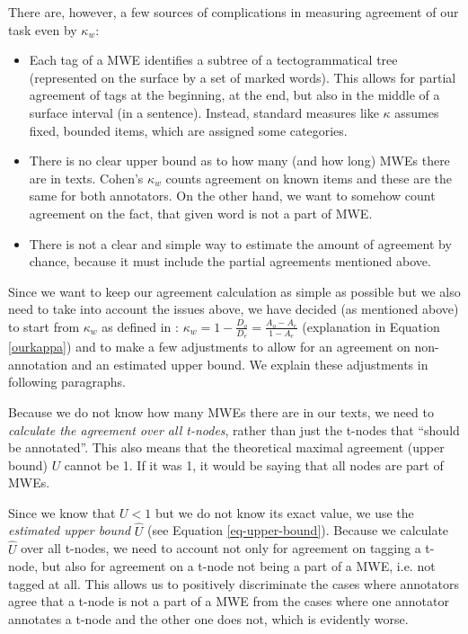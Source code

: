 There are, however, a few sources of complications in measuring agreement of our task even by $\kappa_w$:
\begin{itemize}
	\item %
	Each tag of a MWE identifies a subtree of a tectogrammatical tree (represented on the surface by a set of marked words). This allows for partial agreement of tags at the beginning, at the end, but also in the middle of a surface interval (in a sentence). Instead, standard measures like $\kappa$ assumes fixed, bounded items, which are assigned some categories.
	\item %
	There is no clear upper bound as to how many (and how long) MWEs there are in texts. Cohen's $\kappa_w$ counts agreement on known items and these are the same for both annotators. On the other hand, we want to somehow count agreement on the fact, that given word is not a part of MWE.
	\item 
	There is not a clear and simple way to estimate the amount of agreement by chance, because it must include the partial agreements mentioned above.
\end{itemize}

Since we want to keep our agreement calculation as simple as possible but we also need to take into account the issues above, we have decided (as mentioned above) to start from $\kappa_w$ as defined in \cite{artstein:2007}: $\kappa_w = 1 - \frac{D_o}{D_e} = \frac{A_o - A_e}{1 - A_e}$ (explanation in Equation \ref{ourkappa}) and to make a few adjustments to allow for an agreement on non-annotation and an estimated upper bound. We explain these adjustments in following paragraphs.


Because we do not know how many MWEs there are in our texts, we need to \textit{calculate the agreement over all t-nodes}, rather than just the \mbox{t-nodes} that ``should be annotated''. This also means that the theoretical maximal agreement (upper bound) $U$ cannot be 1. If it was 1, it would be saying that all nodes are part of MWEs. 

Since we know that $U < 1$ but we do not know its exact value, we use the \textit{estimated upper bound} $\widehat{U}$ (see Equation \ref{eq-upper-bound}). Because we calculate $\widehat{U}$ over all t-nodes, we need to account not only for agreement on tagging a t-node, but also for agreement on a t-node not being a part of a MWE, i.e. not tagged at all. 
%
%
This allows us to positively discriminate the cases where annotators agree that a t-node is not a part of a MWE from the cases where one annotator annotates a t-node and the other one does not, which is evidently worse.

